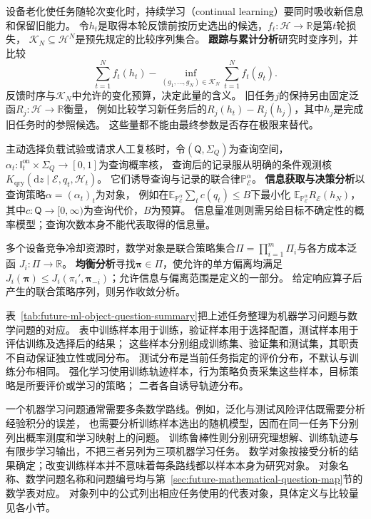 设备老化使任务随轮次变化时，持续学习（continual learning）要同时吸收新信息和保留旧能力。
令$h_t$是取得本轮反馈前按历史选出的候选，$f_t:\mathcal H\to\mathbb R$是第$t$轮损失，
$\mathcal K_N\subseteq\mathcal H^N$是预先规定的比较序列集合。
\textbf{跟踪与累计分析}研究时变序列，并比较
\[
  \sum_{t=1}^N f_t(h_t)
  -\inf_{(g_1,\ldots,g_N)\in\mathcal K_N}
       \sum_{t=1}^N f_t(g_t).
\]
反馈时序与$\mathcal K_N$中允许的变化预算，决定此量的含义。
旧任务$j$的保持另由固定泛函$R_j:\mathcal H\to\mathbb R$衡量，
例如比较学习新任务后的$R_j(h_t)-R_j(h_j)$，其中$h_j$是完成旧任务时的参照候选。
这些量都不能由最终参数是否存在极限来替代。

主动选择负载试验或请求人工复核时，令$(\mathsf Q,\Sigma_Q)$为查询空间，
$\alpha_t:\mathsf I_t^{\mathrm{on}}\times\Sigma_Q\to[0,1]$为查询概率核，
查询后的记录服从明确的条件观测核
$K_{\mathrm{qry}}(\mathrm dz\mid\mathcal E,q_t,\mathscr H_t)$。
它们诱导查询与记录的联合律$\mathbb P_{\mathcal E}^{\alpha}$。
\textbf{信息获取与决策分析}以查询策略$\alpha=(\alpha_t)_t$为对象，
例如在$\mathbb E_{\mathbb P_{\mathcal E}^{\alpha}}\sum_t c(q_t)\leq B$下最小化
$\mathbb E_{\mathbb P_{\mathcal E}^{\alpha}}R_{\mathcal E}(h_N)$，
其中$c:\mathsf Q\to[0,\infty)$为查询代价，$B$为预算。
信息量准则则需另给目标不确定性的概率模型；查询次数本身不能代表取得的信息量。

多个设备竞争冷却资源时，数学对象是联合策略集合$\Pi=\prod_{i=1}^m\Pi_i$与各方成本泛函
$J_i:\Pi\to\mathbb R$。
\textbf{均衡分析}寻找$\bm\pi\in\Pi$，使允许的单方偏离均满足
$J_i(\bm\pi)\leq J_i(\pi_i',\bm\pi_{-i})$；允许信息与偏离范围是定义的一部分。
给定响应算子后产生的联合策略序列，则另作收敛分析。

表~\ref{tab:future-ml-object-question-summary}把上述任务整理为机器学习问题与数学问题的对应。
表中训练样本用于训练，验证样本用于选择配置，测试样本用于评估训练及选择后的结果；
这些样本分别组成训练集、验证集和测试集，其职责不自动保证独立性或同分布。
测试分布是当前任务指定的评价分布，不默认与训练分布相同。
强化学习使用训练轨迹样本，行为策略负责采集这些样本，目标策略是所要评价或学习的策略；
二者各自诱导轨迹分布。

一个机器学习问题通常需要多条数学路线。例如，泛化与测试风险评估既需要分析经验积分的误差，
也需要分析训练样本选出的随机模型，因而在同一任务下分别列出概率测度和学习映射上的问题。
训练鲁棒性则分别研究理想解、训练轨迹与有限步学习输出，不把三者另列为三项机器学习任务。
数学对象按接受分析的结果确定；改变训练样本并不意味着每条路线都以样本本身为研究对象。
对象名称、数学问题名称和问题编号均与第~\ref{sec:future-mathematical-question-map}节的数学表对应。
对象列中的公式列出相应任务使用的代表对象，具体定义与比较量见各小节。

